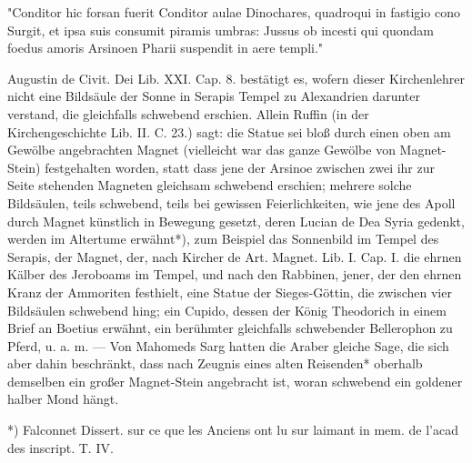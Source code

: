 \documentclass[a4paper, 11pt, oneside, polutonikogreek, german]{article}
\begin{document}
"Conditor hic forsan fuerit Conditor aulae Dinochares, quadroqui in fastigio cono Surgit, et ipsa suis consumit piramis umbras: Jussus ob incesti qui quondam foedus amoris Arsinoen Pharii suspendit in aere templi."

Augustin de Civit. Dei Lib. XXI. Cap. 8. bestätigt es, wofern dieser Kirchenlehrer nicht eine Bildsäule der Sonne in Serapis Tempel zu Alexandrien darunter verstand, die gleichfalls schwebend erschien. Allein Ruffin (in der Kirchengeschichte Lib. II. C. 23.) sagt: die Statue sei bloß durch einen oben am Gewölbe angebrachten Magnet (vielleicht war das ganze Gewölbe von Magnet-Stein) festgehalten worden, statt dass jene der Arsinoe zwischen zwei ihr zur Seite stehenden Magneten gleichsam schwebend erschien; mehrere solche Bildsäulen, teils schwebend, teils bei gewissen Feierlichkeiten, wie jene des Apoll durch Magnet künstlich in Bewegung gesetzt, deren Lucian de Dea Syria gedenkt, werden im Altertume erwähnt*), zum Beispiel das Sonnenbild im Tempel des Serapis, der Magnet, der, nach Kircher de Art. Magnet. Lib. I. Cap. I. die ehrnen Kälber des Jeroboams im Tempel, und nach den Rabbinen, jener, der den ehrnen Kranz der Ammoriten festhielt, eine Statue der Sieges-Göttin, die zwischen vier Bildsäulen schwebend hing; ein Cupido, dessen der König Theodorich in einem Brief an Boetius erwähnt, ein berühmter gleichfalls schwebender Bellerophon zu Pferd, u. a. m. --- Von Mahomeds Sarg hatten die Araber gleiche Sage, die sich aber dahin beschränkt, dass nach Zeugnis eines alten Reisenden* oberhalb demselben ein großer Magnet-Stein angebracht ist, woran schwebend ein goldener halber Mond hängt.

*) Falconnet Dissert. sur ce que les Anciens ont lu sur laimant in mem. de l'acad des inscript. T. IV.
\end{document}
